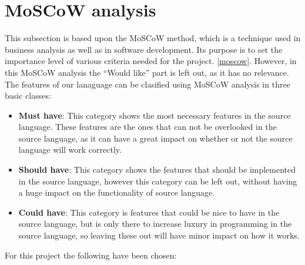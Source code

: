 \section{MoSCoW analysis}
This subsection is based upon the MoSCoW method, which is a technique used in business analysis as well as in software development. Its purpose is to set the importance level of various criteria needed for the project. \ref{moscow}. However, in this MoSCoW analysis the ``Would like'' part is left out, as it has no relevance. \\

The features of our lanaguage can be clasified using MoSCoW analysis in three basic classes:
\begin{itemize}
\item \textbf{Must have}: This category shows the most necessary features in the source language. These features are the ones that can not be overlooked in the source language, as it can have a great impact on whether or not the source language will
work correctly. 

\item \textbf{Should have}: This category shows the features that should be implemented in the source language, however this category can be left out, without having a huge impact on the functionality of source language. 

\item \textbf{Could have}: This category is features that could be nice to have in the source language, but is only there to increase luxury in programming in the source language, so leaving these out will have minor impact on how it works. 
\end{itemize}


For this project the following have been chosen:\\


